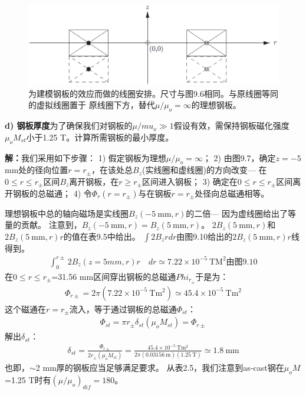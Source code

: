 \begin{figure}
	\centering
	\includegraphics[scale=0.6]{chpt9/figs/fig9.9.eps}
	\caption{为建模钢板的效应而做的线圈安排。尺寸与图9.6相同。与原线圈等同的虚拟线圈置于
	原线圈下方，替代$\mu/\mu_o=\infty$的理想钢板。}
\end{figure}

\textbf{d) 钢板厚度}\qquad 为了确保我们对钢板的$\mu/mu_o\gg 1$假设有效，需保持钢板磁化强度$\mu_o M_{st}$小于1.25 T。计算所需钢板的最小厚度。

\textbf{解：}我们采用如下步骤：
1) 假定钢板为理想$\mu/\mu_o=\infty$；
2) 由图9.7，确定$z=-5$ mm处的径向位置$r=r_{\pm}$，在该处总$B_z$(实线圈和虚线圈)的方向改变---
在$0\le r\le r_{\pm}$区间$B_z$离开钢板，在$r\ge r_{\pm}$区间进入钢板；
3) 确定在$0\le r\le r_{\pm}$区间离开钢板的总磁通；
4) 令$\Phi_r(r=r_{\pm})$与在钢板$r=r_{\pm}$处径向总磁通相等。

理想钢板中总的轴向磁场是实线圈$B_z(-5\ \mathrm{mm},r)$的二倍---
因为虚线圈给出了等量的贡献。
注意到，$B_z(-5\ \mathrm{mm},r)=B_z(5\ \mathrm{mm},r)$。
$2 B_z(5\ \mathrm{mm},r)$和$2 B_z(5\ \mathrm{mm},r)r$的值在表9.5中给出。
$\int 2B_z rdr$由图9.10给出的$2B_z(5\ \mathrm{mm},r)r$线得到。
\begin{align*}%
\int_{0}^{r\pm}2B_{z}(z=5mm,r)r\quad dr\simeq 7.22\times10^{-5}\ \mathrm{TM^{2}}\mbox{由图9.10}
\end{align*}
在$0\le r\le r_{\pm}$=31.56 mm区间穿出钢板的总磁通$Phi_{r_{\pm}}$于是为：
\begin{align*}%
\Phi_{r\pm}=2\pi(7.22\times 10^{-5}\ \mathrm{Tm^{2}})\simeq 45.4\times 10^{-5}\ \mathrm{Tm^{2}}
\end{align*}
这个磁通在$r=r_{\pm}$流入，等于通过钢板的总磁通$\Phi_{st}$：
\begin{align*}%
\Phi_{st}=\pi r_{\pm}\delta_{st}(\mu_{o}M_{st})=\Phi_{r\pm}
\end{align*}
解出$\delta_{st}$：
\begin{align*}%
\delta_{st}=\frac{\Phi_{r\pm}}{2r_{\pm}(\mu_{o}M_{st})}=\frac{45.4\times 10^{-5}\ \mathrm{Tm^{2}}}{2\pi(0.03156\ \mathrm{m})(1.25\ \mathrm{T})}\simeq 1.8\ \mathrm{mm}
\end{align*}
也即，$\sim$2 mm厚的钢板应当足够满足要求。
从表2.5，我们注意到as-cast钢在$\mu_o M$=1.25 T时有$(\mu/\mu_o)_{dif}=180$。

